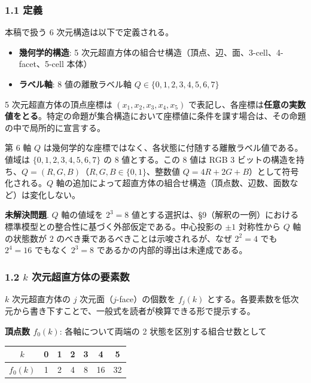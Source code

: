 \documentclass[
  a4paper,11pt]{ltjsarticle}
\newcounter{none}
\providecommand{\tightlist}{%
  \setlength{\itemsep}{0pt}\setlength{\parskip}{0pt}}
\theoremstyle{definition}
\theoremstyle{remark}
\begin{document}
\subsubsection{1.1 定義}\label{ux5b9aux7fa9}

本稿で扱う 6 次元構造は以下で定義される。

\begin{itemize}
\tightlist
\item
  \textbf{幾何学的構造}: 5
  次元超直方体の組合せ構造（頂点、辺、面、3-cell、4-facet、5-cell 本体）
\item
  \textbf{ラベル軸}: 8 値の離散ラベル軸
  \(Q \in \{0, 1, 2, 3, 4, 5, 6, 7\}\)
\end{itemize}

5 次元超直方体の頂点座標は \((x_1, x_2, x_3, x_4, x_5)\)
で表記し、各座標は\textbf{任意の実数値をとる}。特定の命題が集合構造において座標値に条件を課す場合は、その命題の中で局所的に宣言する。

第 6 軸 \(Q\)
は幾何学的な座標ではなく、各状態に付随する離散ラベル値である。値域は
\(\{0, 1, 2, 3, 4, 5, 6, 7\}\) の 8 値とする。この 8 値は RGB 3
ビットの構造を持ち、\(Q = (R, G, B)\)（\(R, G, B \in \{0, 1\}\)、整数値
\(Q = 4R + 2G + B\)）として符号化される。\(Q\)
軸の追加によって超直方体の組合せ構造（頂点数、辺数、面数など）は変化しない。

\textbf{未解決問題}. \(Q\) 軸の値域を \(2^3 = 8\)
値とする選択は、§9（解釈の一例）における標準模型との整合性に基づく外部仮定である。中心投影の
\(\pm 1\) 対称性から \(Q\) 軸の状態数が \(2\)
のべき乗であるべきことは示唆されるが、なぜ \(2^2 = 4\) でも \(2^4 = 16\)
でもなく \(2^3 = 8\) であるかの内部的導出は未達成である。

\subsubsection{\texorpdfstring{1.2 \(k\)
次元超直方体の要素数}{1.2 k 次元超直方体の要素数}}\label{k-ux6b21ux5143ux8d85ux76f4ux65b9ux4f53ux306eux8981ux7d20ux6570}

\(k\) 次元超直方体の \(j\) 次元面（\(j\)-face）の個数を \(f_j(k)\)
とする。各要素数を低次元から書き下すことで、一般式を読者が検算できる形で提示する。

\textbf{頂点数 \(f_0(k)\)}: 各軸について両端の 2
状態を区別する組合せ数として

{\def\LTcaptype{none} %
\begin{longtable}[]{@{}ccccccc@{}}
\toprule\noalign{}
\(k\) & 0 & 1 & 2 & 3 & 4 & 5 \\
\midrule\noalign{}
\endhead
\bottomrule\noalign{}
\endlastfoot
\(f_0(k)\) & 1 & 2 & 4 & 8 & 16 & 32 \\
\end{longtable}
}
\end{document}
